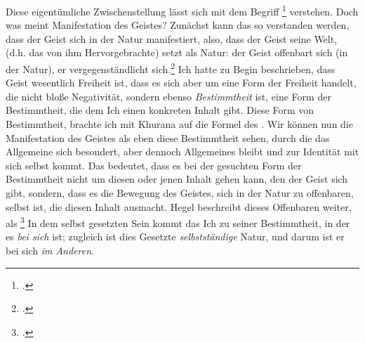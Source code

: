 \documentclass[12pt, a4paper, openany]{report}
\begin{document}
Diese eigentümliche Zwischenstellung lässt sich mit dem Begriff \footcite[][140]{menke_autonomie_2018} verstehen. 
Doch was meint Manifestation des Geistes?
Zunächst kann das so verstanden werden, dass der Geist sich in der Natur manifestiert, also, dass der Geist seine Welt, (d.h. das von ihm Hervorgebrachte) setzt als Natur: der Geist offenbart sich (in der Natur), er vergegenständlicht sich.\footcite[Vgl.][143]{menke_autonomie_2018}
Ich hatte zu Begin beschrieben, dass Geist wesentlich Freiheit ist, dass es sich aber um eine Form der Freiheit handelt, die nicht bloße Negativität, sondern ebenso \emph{Bestimmtheit} ist, eine Form der Bestimmtheit, die dem Ich einen konkreten Inhalt gibt.
Diese Form von Bestimmtheit, brachte ich mit Khurana auf die Formel des .
Wir können nun die Manifestation des Geistes als eben diese Bestimmtheit sehen, durch die das Allgemeine sich besondert, aber dennoch Allgemeines bleibt und zur Identität mit sich selbst kommt.
Das bedeutet, dass es bei der gesuchten Form der Bestimmtheit nicht um diesen oder jenen Inhalt gehen kann, den der Geist sich gibt, sondern, dass es die Bewegung des Geistes, sich in der Natur zu offenbaren, selbst ist, die diesen Inhalt ausmacht. 
Hegel beschreibt dieses Offenbaren weiter, als \footcite[][§ 384, S. 29]{menke_autonomie_2018} 
In dem selbst gesetzten Sein kommt das Ich zu seiner Bestimmtheit, in der es \emph{bei sich} ist; zugleich ist dies Gesetzte \emph{selbstständige} Natur, und darum ist er bei sich \emph{im Anderen}.
\end{document}
